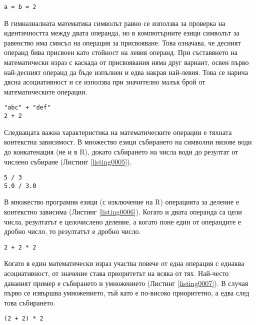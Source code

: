 \begin{lstlisting}[caption=Израз за каскадно присвояване, label=listing0004]
a = b = 2
\end{lstlisting}

В гимназиалната математика символът равно се използва за проверка на идентичността между двата операнда, но в компютърните езици символът за равенство има смисъл на операция за присвояване. Това означава, че десният операнд бива присвоен като стойност на левия операнд. При съставянето на математически израз с каскада от присвоявания няма друг вариант, освен първо най-десният операнд да бъде изпълнен и едва накрая най-левия. Това се нарича дясна асоциативност и се използва при значително малък брой от математическите операции.

\begin{lstlisting}[caption=Контекстна зависимост на операциите, label=listing0005]
"abc" + "def"
2 + 2
\end{lstlisting}

Следващата важна характеристика на математическите операции е тяхната контекстна зависимост. В множество езици събирането на символни низове води до конкатенация (не и в R), докато събирането на числа води до резултат от числено събиране (Листинг \ref{listing0005}).

\begin{lstlisting}[caption=Контекстна зависимост на операцията за делене, label=listing0006]
5 / 3
5.0 / 3.0
\end{lstlisting}

В множество програмни езици (с изключение на R) операцията за деление е контекстно зависима (Листинг \ref{listing0006}). Когато и двата операнда са цели числа, резултатът е целочислено деление, а когато поне един от операндите е дробно число, то резултатът е дробно число.

\begin{lstlisting}[caption=Приоритет на операциите, label=listing0007]
2 + 2 * 2
\end{lstlisting}

Когато в един математически израз участва повече от една операция с еднаква асоциативност, от значение става приоритетът на всяка от тях. Най-често даваният пример е събирането и умножението (Листинг \ref{listing0007}). В случая първо се извършва умножението, тъй като е по-високо приоритетно, а едва след това събирането.

\begin{lstlisting}[caption=Смяна на приоритета, label=listing0008]
(2 + 2) * 2
\end{lstlisting}

